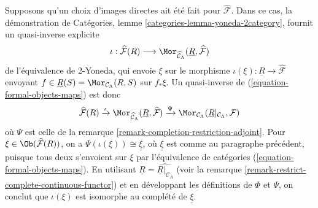 \begin{remark}
\medskip\noindent
Supposons qu'un choix d'images directes ait été fait pour
$\widehat{\mathcal{F}}$. Dans ce cas, la démonstration de Catégories, lemme
\ref{categories-lemma-yoneda-2category}, fournit un quasi-inverse explicite
$$
\iota :
\widehat{\mathcal{F}}(R) \longrightarrow
\Mor_{\widehat{\mathcal{C}}_\Lambda}(
\underline{R}, \widehat{\mathcal{F}})
$$
de l'équivalence de 2-Yoneda, qui envoie $\xi$ sur le morphisme
$\iota(\xi) : \underline{R} \to \widehat{\mathcal{F}}$ envoyant
$f \in \underline{R}(S) = \Mor_{\mathcal{C}_\Lambda}(R, S)$
sur $f_*\xi$. Un quasi-inverse de (\ref{equation-formal-objects-maps}) est
donc
$$
\widehat{\mathcal{F}}(R)
\xrightarrow{\iota}
\Mor_{\widehat{\mathcal{C}}_\Lambda}(
\underline{R}, \widehat{\mathcal{F}})
\xrightarrow{\Psi}
\Mor_{\mathcal{C}_\Lambda}(
\underline{R}|_{\mathcal{C}_\Lambda}, \mathcal{F})
$$
où $\Psi$ est celle de la remarque
\ref{remark-completion-restriction-adjoint}. Pour
$\xi \in \Ob(\widehat{\mathcal{F}}(R))$, on a
$\Psi(\iota(\xi)) \cong \underline{\xi}$, où $\underline{\xi}$ est comme au
paragraphe précédent, puisque tous deux s'envoient sur $\xi$ par
l'équivalence de catégories (\ref{equation-formal-objects-maps}). En utilisant
$\underline{R} = \widehat{\underline{R}|_{\mathcal{C}_\Lambda}}$ (voir la
remarque \ref{remark-restrict-complete-continuous-functor}) et en développant
les définitions de $\Phi$ et $\Psi$, on conclut que $\iota(\xi)$ est isomorphe
au complété de $\underline{\xi}$.
\end{remark}

